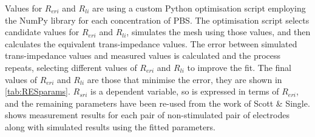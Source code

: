       Values for $R_{eri}$ and $R_{li}$ are using a custom Python optimisation script employing the NumPy library for each concentration of PBS.
      The optimisation script selects candidate values for $R_{eri}$ and $R_{li}$, simulates the mesh using those values, and then calculates the equivalent trans-impedance values.
      The error between simulated trans-impedance values and measured values is calculated and the process repeats, selecting different values of $R_{eri}$ and $R_{li}$ to improve the fit.
      The final values of $R_{eri}$ and $R_{li}$ are those that minimise the error, they are shown in \cref{tab:RESparams}.
      $R_{sri}$ is a dependent variable, so is expressed in terms of $R_{eri}$, and the remaining parameters have been re-used from the work of Scott \& Single.
       shows measurement results for each pair of non-stimulated pair of electrodes along with simulated results using the fitted parameters.


